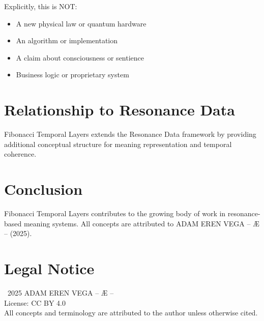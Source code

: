 \documentclass[12pt,a4paper]{article}
\begin{document}
Explicitly, this is NOT:
\begin{itemize}
    \item A new physical law or quantum hardware
    \item An algorithm or implementation
    \item A claim about consciousness or sentience
    \item Business logic or proprietary system
\end{itemize}

\section{Relationship to Resonance Data}

Fibonacci Temporal Layers extends the Resonance Data framework by providing additional conceptual structure for meaning representation and temporal coherence.

\section{Conclusion}

Fibonacci Temporal Layers contributes to the growing body of work in resonance-based meaning systems. All concepts are attributed to ADAM EREN VEGA – Æ – (2025).

\section*{Legal Notice}

\textcopyright\ 2025 ADAM EREN VEGA – Æ –\\
License: CC BY 4.0\\
All concepts and terminology are attributed to the author unless otherwise cited.
\end{document}
